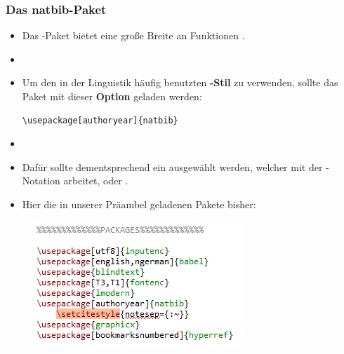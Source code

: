 \begin{frame}[fragile]
\frametitle{Das natbib-Paket}

\begin{itemize}
	\item Das -Paket bietet eine große Breite an Funktionen \citep[vgl.][]{Daly10a}. 
	
	\item[]
	
	\item Um den in der Linguistik häufig benutzten \textbf{-Stil} zu verwenden, sollte das Paket mit dieser \textbf{Option} geladen werden:

\begin{lstlisting}
\usepackage[authoryear]{natbib}
\end{lstlisting}
	
	\item[]
	
	\item Dafür sollte dementsprechend ein \textbf{} ausgewählt werden, welcher mit der -Notation arbeitet, \zB {} oder .

\end{itemize}
\end{frame}


\begin{frame}[fragile]

\begin{itemize}
	\item Hier die in unserer Präambel geladenen Pakete bisher:
\end{itemize}

\begin{figure}
	\centering
	\includegraphics[width=.70\textwidth]{../../texfiles-beamer/tex-material/WissArb-latex/preamble3}
\end{figure}


\end{frame}

